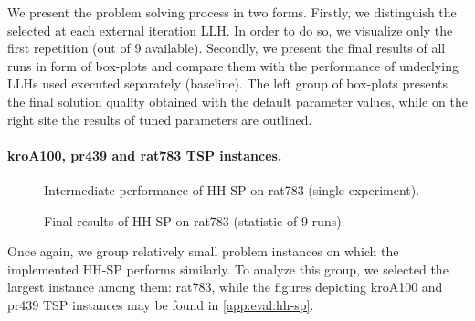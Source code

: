 We present the problem solving process in two forms. Firstly, we distinguish the selected at each external iteration LLH. In order to do so, we visualize only the first repetition (out of 9 available). Secondly, we present the final results of all runs in form of box-plots and compare them with the performance of underlying LLHs used executed separately (baseline). The left group of box-plots presents the final solution quality obtained with the default parameter values, while on the right site the results of tuned parameters are outlined.

\paragraph{kroA100, pr439 and rat783 TSP instances.}
\begin{figure}[t]
	\centering
	\vspace{-20pt}
	
	\caption{Intermediate performance of HH-SP on rat783 (single experiment).}
	\vspace{-5pt}
	\label{eval:pict:hh-sp:rat783 intermediate}
\end{figure}
\begin{figure}[b]
	\centering
	\vspace{-20pt}
	
	\caption{Final results of HH-SP on rat783 (statistic of 9 runs).}
	\vspace{-5pt}
	\label{eval:pict:hh-sp:rat783 final}
\end{figure}
Once again, we group relatively small problem instances on which the implemented HH-SP performs similarly. To analyze this group, we selected the largest instance among them: rat783, while the figures depicting kroA100 and pr439 TSP instances may be found in \cref{app:eval:hh-sp}.

